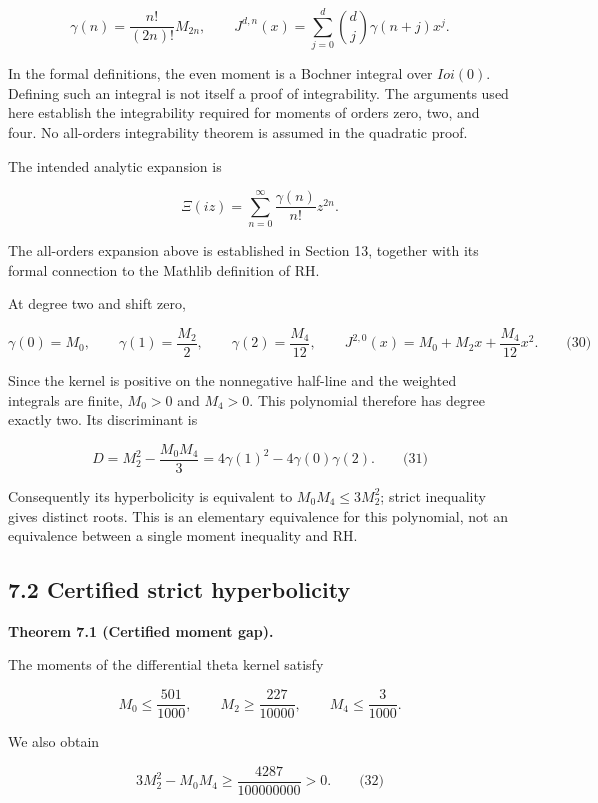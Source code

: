 \documentclass[
  11pt,
]{article}
\begin{document}
\[\gamma(n) = \frac{n!}{(2n)!}M_{2n},\quad\quad J^{d,n}(x) = \sum_{j = 0}^{d}\binom{d}{j}\gamma(n + j)x^{j}.\]

In the formal definitions, the even moment is a Bochner integral over \(Ioi(0)\). Defining such an integral is not itself a proof of integrability. The arguments used here establish the integrability required for moments of orders zero, two, and four. No all-orders integrability theorem is assumed in the quadratic proof.

The intended analytic expansion is

\[\Xi(iz) = \sum_{n = 0}^{\infty}\frac{\gamma(n)}{n!}z^{2n}.\]

The all-orders expansion above is established in Section 13, together with its formal connection to the Mathlib definition of RH.

At degree two and shift zero,

\[\gamma(0) = M_{0},\quad\quad\gamma(1) = \frac{M_{2}}{2},\quad\quad\gamma(2) = \frac{M_{4}}{12},\quad\quad J^{2,0}(x) = M_{0} + M_{2}x + \frac{M_{4}}{12}x^{2}.\quad\quad\text{(30)}\]

Since the kernel is positive on the nonnegative half-line and the weighted integrals are finite, \(M_{0} > 0\) and \(M_{4} > 0\). This polynomial therefore has degree exactly two. Its discriminant is

\[D = M_{2}^{2} - \frac{M_{0}M_{4}}{3} = 4\gamma(1)^{2} - 4\gamma(0)\gamma(2).\quad\quad\text{(31)}\]

Consequently its hyperbolicity is equivalent to \(M_{0}M_{4} \leq 3M_{2}^{2}\); strict inequality gives distinct roots. This is an elementary equivalence for this polynomial, not an equivalence between a single moment inequality and RH.

\hypertarget{certified-strict-hyperbolicity}{%
\subsection{7.2 Certified strict hyperbolicity}\label{certified-strict-hyperbolicity}}

\textbf{Theorem 7.1 (Certified moment gap).}

The moments of the differential theta kernel satisfy

\[M_{0} \leq \frac{501}{1000},\quad\quad M_{2} \geq \frac{227}{10000},\quad\quad M_{4} \leq \frac{3}{1000}.\]

We also obtain

\[3M_{2}^{2} - M_{0}M_{4} \geq \frac{4287}{100000000} > 0.\quad\quad\text{(32)}\]
\end{document}
